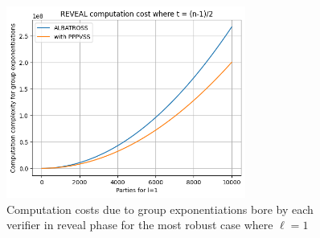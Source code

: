 \begin{figure}[H]
  \centering
  \includegraphics[width=0.7\textwidth]{figures/exponent.png}
  \caption{Computation costs due to group exponentiations bore by each verifier in 
  reveal phase for the most robust case where $\ell=1$}
  \label{fig:commit_exponent}
\end{figure}